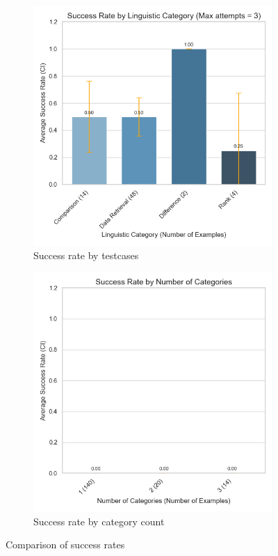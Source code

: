 \begin{figure}
    \centering
    \begin{subfigure}{0.48\linewidth}
        \centering
        \includegraphics[width=\linewidth]{fig/success_rate_by_category}
        \caption{Success rate by testcases}
        \label{fig:success_rate_by_category}
    \end{subfigure}\hfill
    \begin{subfigure}{0.48\linewidth}
        \centering
        \includegraphics[width=\linewidth]{fig/success_rate_by_category_count}
        \caption{Success rate by category count}
        \label{fig:success_rate_by_category_count}
    \end{subfigure}
    \caption{Comparison of success rates}
    \label{fig:success_rate_comparison}
\end{figure}
